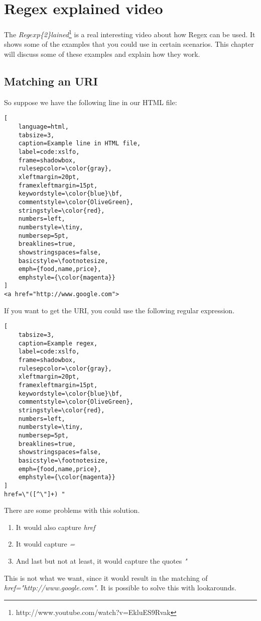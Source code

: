 \chapter{Regex explained video}
\label{chap:regex-explained}

The \textit{Reg\(exp\)\{2\}lained}\footnote{http://www.youtube.com/watch?v=EkluES9Rvak}  is a real interesting video about how Regex can be used. It shows some of the examples that you could use in certain scenarios. This chapter will discuss some of these examples and explain how they work.

\section{Matching an URI}
\label{sec:matching-an-uri}
So suppose we have the following line in our HTML file:
\begin{lstlisting}[
	language=html,
	tabsize=3,
	caption=Example line in HTML file,
	label=code:xslfo,
	frame=shadowbox,
	rulesepcolor=\color{gray},
	xleftmargin=20pt,
	framexleftmargin=15pt,
	keywordstyle=\color{blue}\bf,
	commentstyle=\color{OliveGreen},
	stringstyle=\color{red},
	numbers=left,
	numberstyle=\tiny,
	numbersep=5pt,
	breaklines=true,
	showstringspaces=false,
	basicstyle=\footnotesize,
	emph={food,name,price},
	emphstyle={\color{magenta}}
]
<a href="http://www.google.com">
\end{lstlisting}

If you want to get the URI, you could use the following regular expression.
\begin{lstlisting}[
	tabsize=3,
	caption=Example regex,
	label=code:xslfo,
	frame=shadowbox,
	rulesepcolor=\color{gray},
	xleftmargin=20pt,
	framexleftmargin=15pt,
	keywordstyle=\color{blue}\bf,
	commentstyle=\color{OliveGreen},
	stringstyle=\color{red},
	numbers=left,
	numberstyle=\tiny,
	numbersep=5pt,
	breaklines=true,
	showstringspaces=false,
	basicstyle=\footnotesize,
	emph={food,name,price},
	emphstyle={\color{magenta}}
]
href=\"([^\"]+) "
\end{lstlisting}
There are some problems with this solution.
\begin{enumerate}
\item It would also capture \textit{href}
\item It would capture \textit{=}
\item And last but not at least, it would capture the quotes \textit{"}
\end{enumerate}
This is not what we want, since it would result in the matching of \textit{href="http://www.google.com"}. It is possible to solve this with lookarounds.

